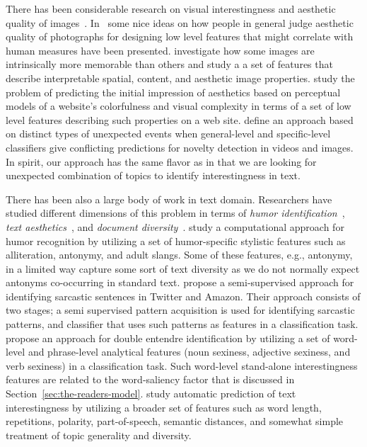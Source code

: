There has been considerable research on visual interestingness and aesthetic quality of images~\cite{Datta:2006:SAP:2129560.2129588,Datta:2008:4233023,Ke:2006:DHF:1153170.1153495,IsolaParikhTorralbaOliva2011,dhar:2011,reinecke2013predicting,journals/pami/WeinshallZHKOABGNPHP12,journals/pami/WeinshallZHKOABGNPHP12}. In~\cite{Datta:2006:SAP:2129560.2129588,Datta:2008:4233023,Ke:2006:DHF:1153170.1153495,dhar:2011} some nice ideas on how people in general judge aesthetic quality of photographs for designing low level features that might correlate with human measures have been presented. \cite{IsolaParikhTorralbaOliva2011} investigate how some images are intrinsically more memorable than others and study a a set of features that describe interpretable spatial, content, and aesthetic image properties. \cite{reinecke2013predicting,journals/pami/WeinshallZHKOABGNPHP12}  study the problem of predicting the initial impression of aesthetics
based on perceptual models of a website's colorfulness and visual complexity in terms of a set of low level features describing such properties on a web site.  
\cite{journals/pami/WeinshallZHKOABGNPHP12} define an approach based on distinct types of unexpected events when general-level and specific-level classifiers give conflicting predictions for novelty detection in videos and images. In spirit, our approach has the same flavor as \cite{journals/pami/WeinshallZHKOABGNPHP12}  in that we are looking for unexpected combination of topics to identify interestingness in text.

 
There has been also a large body of work in text domain. Researchers have studied different dimensions of this problem in terms of {\em humor identification}~\cite{Mihalcea:2005:MCL:1220575.1220642,Davidov:2010:SRS:1870568.1870582,Kiddon11,labutov-lipson:2012:ACL2012short},
{\em text aesthetics}~\cite{journals:tamd:Schmidhuber10,N13-1118,ganguly:2014}, and {\em document diversity}~\cite{bache:2013}.  \cite{Mihalcea:2005:MCL:1220575.1220642} study a computational approach for humor recognition by utilizing a set of humor-specific stylistic features such as alliteration, antonymy, and adult slangs. Some of these features, e.g., antonymy, in a limited way capture some sort of text diversity as we do not normally expect antonyms co-occurring in standard text. \cite{Davidov:2010:SRS:1870568.1870582}  propose a semi-supervised approach for identifying sarcastic sentences
in Twitter and Amazon.  Their approach consists of two stages; a semi supervised pattern acquisition is used for identifying
sarcastic patterns, and classifier that uses such patterns as features in a classification task. \cite{Kiddon11} propose an approach for double entendre identification by utilizing  a set of word-level and phrase-level analytical features (noun sexiness, adjective sexiness, and verb sexiness) in a classification task. Such word-level stand-alone interestingness features are related to the word-saliency factor that is discussed in Section~\ref{sec:the-readers-model}. \cite{ganguly:2014} study automatic prediction of text interestingness by utilizing a broader set of features such as word length, repetitions, polarity, part-of-speech, semantic distances, and somewhat simple treatment of topic generality and diversity.

